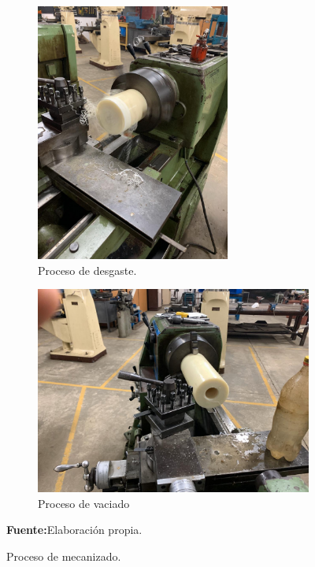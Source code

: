 \begin{figure}[H]
\centering
     \begin{subfigure}[b]{0.45\textwidth}
         \centering
         \includegraphics[width=0.7\textwidth]{Imagenes/2019/Sonda_Fab0.jpeg}
         \caption{Proceso de desgaste.}
         \label{fig:preparacion}
     \end{subfigure}
     \begin{subfigure}[b]{0.5\textwidth}
         \centering
         \includegraphics[width=\textwidth]{Imagenes/2019/Sonda_Fab.jpeg}
         \caption{Proceso de vaciado}
         \label{fig:preparacion_vaciado}
     \end{subfigure}
\caption[Proceso de mecanizado. Tubo de tefl\'on]{Proceso de mecanizado.}
\textbf{Fuente:}Elaboraci\'on propia.
\hfill
\end{figure}

